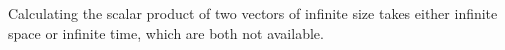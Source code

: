 Calculating the scalar product of two vectors of infinite size takes either infinite space or infinite time, which are both not available.
